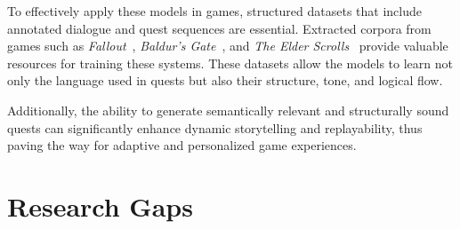 To effectively apply these models in games, structured datasets that include annotated
dialogue and quest sequences are essential. Extracted corpora from games such as
\textit{Fallout}~\cite{fallout1,fallout2}, \textit{Baldur's Gate}~\cite{baldursgate,baldursgate2shadowsofamn}, and \textit{The Elder Scrolls}~\cite{theelderscrollsivoblivion,theelderscrollsvskyrim} provide valuable
resources for training these systems. These datasets allow the models to learn not only
the language used in quests but also their structure, tone, and logical flow.

Additionally, the ability to generate semantically relevant and structurally sound
quests can significantly enhance dynamic storytelling and replayability, thus paving the
way for adaptive and personalized game experiences.

\section{Research Gaps}

